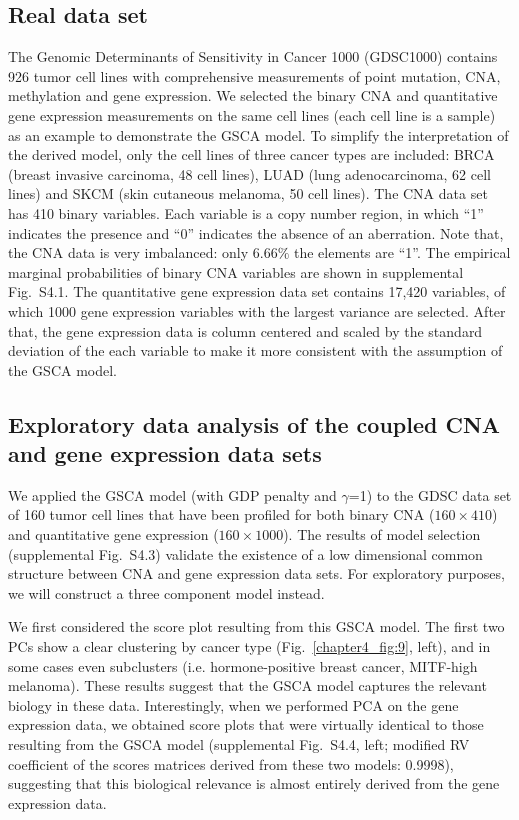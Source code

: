 \subsection{Real data set}
The Genomic Determinants of Sensitivity in Cancer 1000 (GDSC1000) \cite{iorio2016landscape} contains 926 tumor cell lines with comprehensive measurements of point mutation, CNA, methylation and gene expression. We selected the binary CNA and quantitative gene expression measurements on the same cell lines (each cell line is a sample) as an example to demonstrate the GSCA model. To simplify the interpretation of the derived model, only the cell lines of three cancer types are included: BRCA (breast invasive carcinoma, 48 cell lines), LUAD (lung adenocarcinoma, 62 cell lines) and SKCM (skin cutaneous melanoma, 50 cell lines). The CNA data set has 410 binary variables. Each variable is a copy number region, in which ``1'' indicates the presence and ``0'' indicates the absence of an aberration. Note that, the CNA data is very imbalanced: only $6.66\%$ the elements are ``1''. The empirical marginal probabilities of binary CNA variables are shown in supplemental Fig.~S4.1. The quantitative gene expression data set contains 17,420 variables, of which 1000 gene expression variables with the largest variance are selected. After that, the gene expression data is column centered and scaled by the standard deviation of the each variable to make it more consistent with the assumption of the GSCA model.

\subsection{Exploratory data analysis of the coupled CNA and gene expression data sets}
We applied the GSCA model (with GDP penalty and $\gamma$=1) to the GDSC data set of 160 tumor cell lines that have been profiled for both binary CNA ($160 \times 410$) and quantitative gene expression ($160 \times 1000$). The results of model selection (supplemental Fig.~S4.3) validate the existence of a low dimensional common structure between CNA and gene expression data sets. For exploratory purposes, we will construct a three component model instead.

We first considered the score plot resulting from this GSCA model. The first two PCs show a clear clustering by cancer type (Fig.~\ref{chapter4_fig:9}, left), and in some cases even subclusters (i.e. hormone-positive breast cancer, MITF-high melanoma). These results suggest that the GSCA model captures the relevant biology in these data. Interestingly, when we performed PCA on the gene expression data, we obtained score plots that were virtually identical to those resulting from the GSCA model (supplemental Fig.~S4.4, left; modified RV coefficient of the scores matrices derived from these two models: 0.9998), suggesting that this biological relevance is almost entirely derived from the gene expression data.

